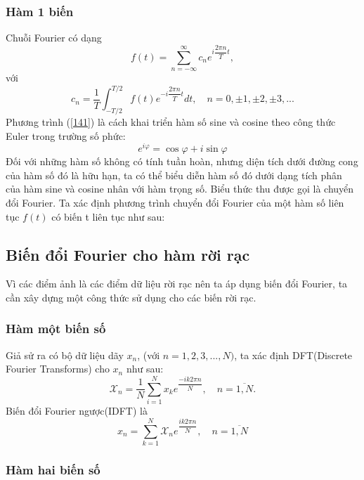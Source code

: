\documentclass[12pt,a4paper]{report}
\numberwithin{equation}{section}
\theoremstyle{definition} %
\begin{document}
\subsubsection{Hàm 1 biến}
Chuỗi Fourier có dạng
\begin{equation}
	\label{141}
    f(t)= \sum_{n=-\infty} ^{\infty} c_ne^{i\dfrac{2\pi n}{T}t},
\end{equation}
với
\begin{equation}
	\label{142}
    c_n=\dfrac{1}{T}\displaystyle\int_{-T/2}^{T/2} f(t)e^{-i\dfrac{2\pi n}{T}t}dt,\quad n=0,\pm 1,\pm 2, \pm 3,...
\end{equation}
Phương trình (\ref{141}) là cách khai triển hàm số sine và cosine theo công thức Euler trong trường số phức:
\begin{equation}
	\label{143}
    e^{i\varphi}=\cos\varphi+i \sin\varphi
\end{equation}
Đối với những hàm số không có tính tuần hoàn, nhưng diện tích dưới đường cong của hàm số đó là hữu hạn, ta có thể biểu diễn hàm số đó dưới dạng tích phân của hàm sine và cosine nhân với hàm trọng số. Biểu thức thu được gọi là chuyển đổi Fourier.
Ta xác định phương trình chuyển đổi Fourier của một hàm số liên tục $f(t)$ có biến t liên tục như sau:


\subsection{Biến đổi Fourier cho hàm rời rạc}

Vì các điểm ảnh là các điểm dữ liệu rời rạc nên ta áp dụng biến đổi Fourier, ta cần xây dựng một công thức sử dụng cho các biến rời rạc.

\subsubsection{Hàm một biến số}

Giả sử ra có bộ dữ liệu dãy $x_n$, (với $n= 1,2,3,...,N)$, ta xác định DFT(Discrete Fourier Transforms) cho $x_n$ như sau: 
\begin{equation}
	\label{144}
    \mathcal{X}_n= \dfrac{1}{N}\sum_{i=1}^Nx_ke^{\dfrac{-ik2\pi n}{N}},\quad n=\overline{1,N}.
\end{equation}
Biến đổi Fourier ngược(IDFT) là
\begin{equation}
	\label{145}
    x_n =\sum_{k=1}^N\mathcal{X}_ne^{\dfrac{ik2\pi n}{N}},\quad n=\overline{1,N}
\end{equation}
\subsubsection{Hàm hai biến số}
\end{document}
